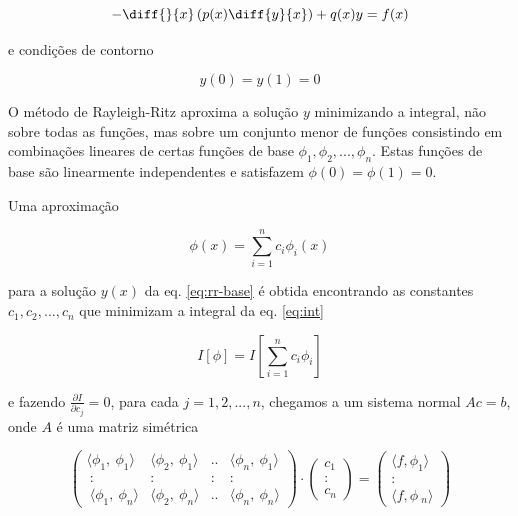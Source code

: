 \documentclass[a4,12pt]{horizon-theme}
\begin{document}
\begin{equation}\label{eq:rr-base}
  -\diff{}{x}\left(p(x)\diff{y}{x}\right) + q(x)y = f(x)
\end{equation}

e condições de contorno

\begin{equation}\label{eq:cc}
  y(0) = y(1) = 0
\end{equation}

O método de Rayleigh-Ritz aproxima a solução $y$ minimizando a integral, não sobre todas as funções, mas sobre um conjunto menor de funções consistindo em combinações lineares de certas funções de base $\phi_1, \phi_2, ..., \phi_n$. Estas funções de base são linearmente independentes e satisfazem $\phi(0) = \phi(1) = 0$.

Uma aproximação

\begin{equation}\label{eq:phi-h}
  \phi(x) = \sum_{i=1}^n c_i\phi_i(x)
\end{equation}

para a solução $y(x)$ da eq. \eqref{eq:rr-base} é obtida encontrando as constantes $c_1, c_2, ..., c_n$ que minimizam a integral da eq. \eqref{eq:int}

\begin{equation}\label{eq:int}
  I[\phi] = I\left[\sum_{i=1}^n c_i\phi_i\right]
\end{equation}

e fazendo $\displaystyle\frac{\partial I}{\partial c_j} = 0$, para cada $j = 1, 2, ..., n$, chegamos a um sistema normal $Ac = b$, onde $A$ é uma matriz simétrica

\begin{equation}\label{eq:tridiagonal}
  \begin{pmatrix}
    \langle\phi _1,\:\phi _1\rangle   & \langle\phi _2,\:\phi _1\rangle & .. & \langle\phi _n,\:\phi _1\rangle \\
    \::                               & :                               & :  & :                               \\
    \:\langle\phi _1,\:\phi _n\rangle & \langle\phi _2,\:\phi _n\rangle & .. & \langle\phi _n,\:\phi _n\rangle
  \end{pmatrix}
  \cdot
  \begin{pmatrix}
    c _1 \\ :\\ c _n
  \end{pmatrix}
  =
  \begin{pmatrix}
    \langle f,\phi _1\rangle \\
    :                        \\
    \langle f,\phi \:_n\rangle
  \end{pmatrix}
\end{equation}
\end{document}
